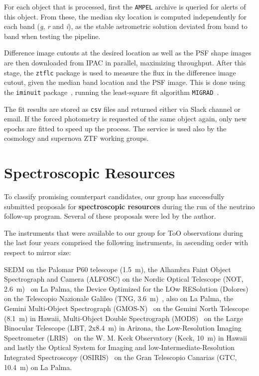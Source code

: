 For each object that is processed, first the \texttt{AMPEL} archive is queried for alerts of this object. From these, the median sky location is computed independently for each band (\textit{g}, \textit{r} and \textit{i}), as the stable astrometric solution deviated from band to band when testing the pipeline.

Difference image cutouts at the desired location as well as the PSF shape images are then downloaded from IPAC in parallel, maximizing throughput. After this stage, the \texttt{ztflc} package is used to measure the flux in the difference image cutout, given the median band location and the PSF image. This is done using the \texttt{iminuit} package~, running the least-square fit algorithm \texttt{MIGRAD}~.

The fit results are stored as \texttt{csv} files and returned either via Slack channel or email. If the forced photometry is requested of the same object again, only new epochs are fitted to speed up the process. The service is used also by the cosmology and supernova ZTF working groups.

\section{Spectroscopic Resources}\label{spec_resources}
To classify promising counterpart candidates, our group has successfully submitted proposals for \textbf{spectroscopic resources} during the run of the neutrino follow-up program. Several of these proposals were led by the author.

The instruments that were available to our group for ToO observations during the last four years comprised the following instruments, in ascending order with respect to mirror size:

SEDM on the Palomar P60 telescope (\SI{1.5}{\meter}), the Alhambra Faint Object Spectrograph and Camera (ALFOSC) on the Nordic Optical Telescope (NOT, \SI{2.6}{\meter})~ on La Palma, the Device Optimized for the LOw RESolution (Dolores) on the Telescopio Nazionale Galileo (TNG, \SI{3.6}{\meter})~, also on La Palma, the Gemini Multi-Object Spectrograph (GMOS-N)~ on the Gemini North Telescope (\SI{8.1}{\meter}) in Hawaii, Multi-Object Double Spectrograph (MODS)~ on the Large Binocular Telescope (LBT, 2x\SI{8.4}{\meter}) in Arizona, the Low-Resolution Imaging Spectrometer (LRIS)~ on the W. M. Keck Observatory (Keck, \SI{10}{\meter}) in Hawaii and lastly the Optical System for Imaging and low-Intermediate-Resolution Integrated Spectroscopy (OSIRIS)~ on the Gran Telescopio Canarias (GTC, \SI{10.4}{\meter}) on La Palma.

